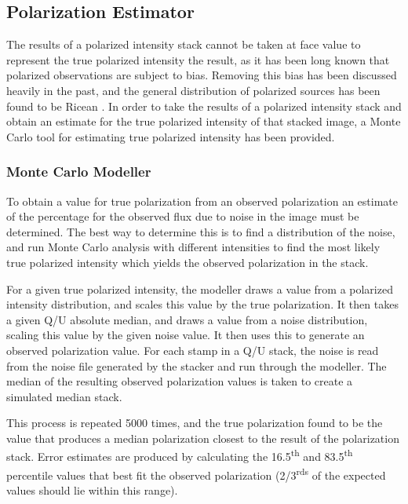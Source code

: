 \documentclass{article}
\begin{document}
\subsection{Polarization Estimator}
The results of a polarized intensity stack cannot be taken at face value to represent the true polarized intensity the result, as it has been long known that
polarized observations are subject to bias.  Removing this bias has been 
discussed heavily in the past, and the general distribution of polarized sources
has been found to be Ricean \cite[Simmons \& Stewart 1985]{SandS1985}.  In order
to take the results of a polarized intensity stack and obtain an estimate for 
the true polarized intensity of that stacked image, a Monte Carlo tool for 
estimating true polarized intensity has been provided.

\subsubsection{Monte Carlo Modeller}
To obtain a value for true polarization from an observed polarization an 
estimate of the percentage for the observed flux due to noise in the image must
be determined.  The best way to determine this is to find a distribution of the
noise, and run Monte Carlo analysis with different intensities to find the most
likely true polarized intensity which yields the observed polarization in the
stack.\par
For a given true polarized intensity, the modeller draws a value from a 
polarized intensity distribution, and scales this value by the true 
polarization.  It then takes a given Q/U absolute median, and draws a value from
a noise distribution, scaling this value by the given noise value.  It then uses
this to generate an observed polarization value.  For each stamp in a Q/U stack,
the noise is read from the noise file generated by the stacker and run through
the modeller.  The median of the resulting observed polarization values is taken
to create a simulated median stack.\par

This process is repeated 5000 times, and the true polarization found to be the 
value that produces a median polarization closest to the result of the 
polarization stack.  Error estimates are produced by calculating the 
16.5\textsuperscript{th} and 83.5\textsuperscript{th} percentile values that 
best fit the observed polarization (2/3\textsuperscript{rds} of the expected values should lie within this range).
\end{document}
